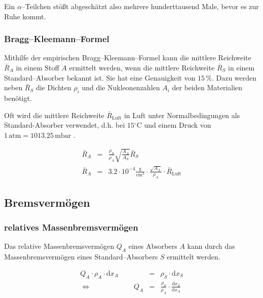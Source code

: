 \documentclass[12pt,a4paper]{scrartcl}
\numberwithin{equation}{section} %
\begin{document}
\noindent
Ein $\alpha$--Teilchen stößt abgeschätzt also mehrere hunderttausend Male, bevor es zur Ruhe kommt.

\hypertarget{bragg-kleemann-formel}{%
\subsubsection{Bragg--Kleemann--Formel}\label{bragg-kleemann-formel}}

Mithilfe der empirischen Bragg--Kleemann--Formel kann die mittlere Reichweite $\bar R_A$ in einem Stoff $A$ ermittelt werden, wenn die mittlere Reichweite $\bar R_S$ in einem Standard--Absorber bekannt ist. Sie hat eine Genauigkeit von $15\,\%$. Dazu werden neben $\bar R_S$ die Dichten $\rho_i$ und die Nukleonenzahlen $A_i$ der beiden Materialien benötigt.

Oft wird die mittlere Reichweite $\bar R_\mathrm{Luft}$ in Luft unter Normalbedingungen als Standard-Absorber verwendet, d.h. bei $15\mathrm{^\circ C}$ und einem Druck von $1\mathrm{\,atm}=1013.25\mathrm{\,mbar}$ \cite{DWD}.

\begin{eqnarray}
    \bar R_A &=& \frac{\rho_S}{\rho_A}
        \sqrt{\frac{A_A}{A_S}} \bar R_S \\
    \bar R_A &=& 3.2\cdot 10^{-4} \mathrm{\frac{g}{cm^3}}
        \cdot\frac{\sqrt{A_A}}{\rho_A}\cdot \bar R_\mathrm{Luft}
\end{eqnarray}

\hypertarget{bremsvermuxf6gen}{%
	\subsection{Bremsvermögen}\label{bremsvermuxf6gen}}

\hypertarget{relatives-massenbremsvermuxf6gen}{%
	\subsubsection{relatives
		Massenbremsvermögen}\label{relatives-massenbremsvermuxf6gen}}

Das relative Massenbremsvermögen $Q_A$ eines Absorbers $A$ kann durch das Massenbremsvermögen eines Standard--Absorbers $S$ ermittelt werden.

\begin{eqnarray}
	Q_A \cdot \rho_A \cdot \mathrm dx_A
	&=& \rho_S \cdot \mathrm dx_S \\
	\Leftrightarrow \qquad\qquad\qquad Q_A \label{eq:Q_A}
	&=& \frac{\rho_S}{\rho_A}
	\cdot \frac{\mathrm dx_S}{\mathrm dx_A}
\end{eqnarray}
\end{document}
